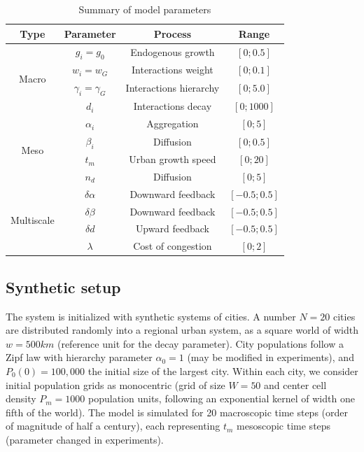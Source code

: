 \documentclass[ijgi,article,submit,moreauthors,pdftex]{Definitions/mdpi}
\begin{document}
	
\begin{table}[H]
	\caption{Summary of model parameters\label{tab:parameters}}
	\centering
	\begin{tabular}{|c|c|c|c|}
	\hline
		Type & Parameter & Process & Range \\\hline
		\multirow{4}{*}{Macro} & $g_i = g_0$ & Endogenous growth & $\left[0 ; 0.5\right]$ \\
		& $w_i = w_G$ & Interactions weight & $\left[0 ; 0.1\right]$ \\
		& $\gamma_i = \gamma_G$ & Interactions hierarchy & $\left[0 ; 5.0\right]$ \\
		& $d_i$ & Interactions decay & $\left[0 ; 1000\right]$ \\ \hline
		\multirow{4}{*}{Meso} & $\alpha_i$ & Aggregation & $\left[0 ; 5\right]$ \\
		& $\beta_i$ & Diffusion & $\left[0 ; 0.5\right]$ \\
		& $t_m$ & Urban growth speed & $\left[0 ; 20\right]$ \\
		& $n_d$ & Diffusion & $\left[0 ; 5\right]$ \\ \hline
		\multirow{4}{*}{Multiscale} & $\delta\alpha$ & Downward feedback & $\left[-0.5 ; 0.5\right]$ \\
		& $\delta\beta$ & Downward feedback & $\left[-0.5 ; 0.5\right]$ \\
		& $\delta d$ & Upward feedback & $\left[-0.5 ; 0.5\right]$ \\\hline
		& $\lambda$ & Cost of congestion & $\left[0 ; 2\right]$ \\\hline
	\end{tabular}
\end{table}



\subsection{Synthetic setup}

The system is initialized with synthetic systems of cities. A number $N=20$ cities are distributed randomly into a regional urban system, as a square world of width $w=500km$ (reference unit for the decay parameter). City populations follow a Zipf law with hierarchy parameter $\alpha_0 = 1$ (may be modified in experiments), and $P_0 (0) = 100,000$ the initial size of the largest city. Within each city, we consider initial population grids as monocentric (grid of size $W=50$ and center cell density $P_m = 1000$ population units, following an exponential kernel of width one fifth of the world). %
The model is simulated for 20 macroscopic time steps (order of magnitude of half a century), each representing $t_m$ mesoscopic time steps (parameter changed in experiments).
\end{document}
